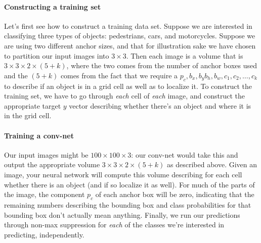 \documentclass[12pt]{article}
\begin{document}
\paragraph{Constructing a training set}
Let's first see how to construct a training data set. Suppose we are interested in classifying three types of objects: pedestrians, cars, and motorcycles. Suppose we are using two different anchor sizes, and that for illustration sake we have chosen to partition our input images into $3 \times 3$. Then each image is a volume that is $3 \times 3 \times 2 \times (5 + k)$, where the two comes from the number of anchor boxes used and the $(5 + k)$ comes from the fact that we require a $p_c, b_x, b_y b_h, b_w, c_1, c_2, \ldots, c_k$ to describe if an object is in a grid cell as well as to localize it. To construct the training set, we have to go through \emph{each} cell of \emph{each} image, and construct the appropriate target $y$ vector describing whether there's an object and where it is in the grid cell.

\paragraph{Training a conv-net} Our input images might be
$100 \times 100 \times 3$: our conv-net would take this and output the appropriate volume
$3 \times 3 \times 2 \times (5 + k)$ as described above. Given an image, your neural network will compute this volume describing for each cell whether there is an object (and if so localize it as well). For much of the parts of the image, the component $p_c$ of each anchor box will be zero, indicating that the remaining numbers describing the bounding box and class probabilities for that bounding box don't actually mean anything. Finally, we run our predictions through non-max suppression for \emph{each} of the classes we're interested in predicting, independently.
\end{document}
